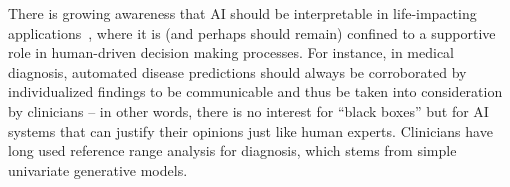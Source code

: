 \documentclass[english]{scrartcl}
\begin{document}
There is growing awareness that AI should be interpretable in life-impacting applications~\cite{Molnar-18}, where it is (and perhaps should remain) confined to a supportive role in human-driven decision making processes. For instance, in medical diagnosis, automated disease predictions should always be corroborated by individualized findings to be communicable and thus be taken into consideration by clinicians -- in other words, there is no interest for ``black boxes'' but for AI systems that can justify their opinions just like human experts. Clinicians have long used reference range analysis for diagnosis, which stems from simple univariate generative models.







\end{document}
